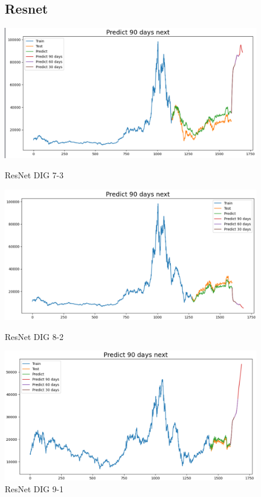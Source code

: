 \documentclass[conference]{IEEEtran}
\begin{document}
\pagebreak
\begin{figure}[htbp]
\subsection{Resnet}
\centering
    \begin{minipage}{0.23\textwidth}
    \centering
    \includegraphics[width=1\textwidth]{experiment/resnet/DIG 7_3.png}
    \caption{ResNet DIG 7-3}
    \label{fig:nvl_boxplot}
    \end{minipage}
    \hfill
    \begin{minipage}{0.23\textwidth}
    \centering
    \includegraphics[width=1\textwidth]{experiment/resnet/DIG 8_2.png}
    \caption{ResNet DIG 8-2}
    \label{fig:nvl_histogram}
    \end{minipage}
    \begin{minipage}{0.23\textwidth}
    \centering
    \includegraphics[width=1\textwidth]{experiment/resnet/DIG 9_1.png}
    \caption{ResNet DIG 9-1}
    \label{fig:nvl_histogram}
    \end{minipage}


\end{figure}
\end{document}
